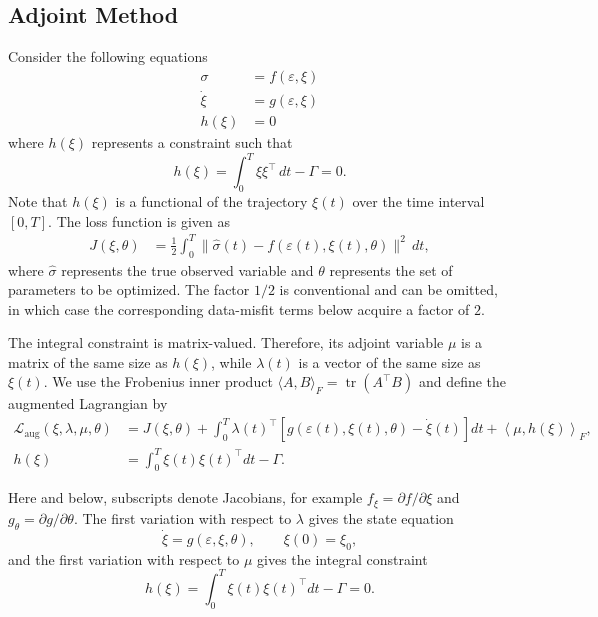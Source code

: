 \documentclass[11pt]{article}
\begin{document}
\subsection{Adjoint Method}
\label{a:sec:adjoint-method}
Consider the following equations
\begin{align}
    \sigma    & = f(\varepsilon, \xi) \\
    \dot{\xi} & = g(\varepsilon, \xi) \\
    h(\xi)    & = 0
\end{align}
where $h(\xi)$ represents a constraint such that
\begin{equation}
    h(\xi) = \int_0^T \xi \xi^\top \,dt - \Gamma = 0.
\end{equation}
Note that $h(\xi)$ is a functional of the trajectory $\xi(t)$ over the time interval $[0, T]$.
The loss function is given as
\begin{align}
    J(\xi,\theta)
     & = \frac{1}{2}\int_0^T
    \|\widehat{\sigma}(t)-f(\varepsilon(t),\xi(t),\theta)\|^2\,dt,
\end{align}
where $\widehat{\sigma}$ represents the true observed variable and $\theta$ represents the set of parameters to be optimized.
The factor $1/2$ is conventional and can be omitted, in which case the
corresponding data-misfit terms below acquire a factor of $2$.

The integral constraint is matrix-valued. Therefore, its adjoint variable
$\mu$ is a matrix of the same size as $h(\xi)$, while $\lambda(t)$ is a vector
of the same size as $\xi(t)$. We use the Frobenius inner product
$\langle A,B\rangle_F=\operatorname{tr}(A^\top B)$ and define the augmented
Lagrangian by
\begin{align}
    \mathcal{L}_{\mathrm{aug}}(\xi,\lambda,\mu,\theta)
           & = J(\xi,\theta)
    +\int_0^T \lambda(t)^\top
    \left[g(\varepsilon(t),\xi(t),\theta)-\dot{\xi}(t)\right]dt
    +\left\langle \mu,h(\xi)\right\rangle_F,       \\
    h(\xi) & =\int_0^T\xi(t)\xi(t)^\top dt-\Gamma.
\end{align}

Here and below, subscripts denote Jacobians, for example
$f_\xi=\partial f/\partial\xi$ and $g_\theta=\partial g/\partial\theta$.
The first variation with respect to $\lambda$ gives the state equation
\begin{equation}
    \dot{\xi}=g(\varepsilon,\xi,\theta),
    \qquad \xi(0)=\xi_0,
\end{equation}
and the first variation with respect to $\mu$ gives the integral constraint
\begin{equation}
    h(\xi)=\int_0^T\xi(t)\xi(t)^\top dt-\Gamma=0.
\end{equation}
\end{document}
